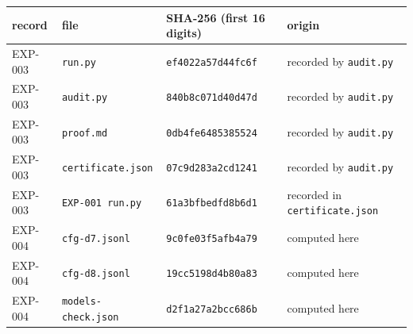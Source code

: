 \begin{tabular}{llll}
\toprule
record & file & SHA-256 (first 16 digits) & origin \\
\midrule
EXP-003 & \texttt{run.py} & \texttt{ef4022a57d44fc6f} & recorded by \texttt{audit.py} \\
EXP-003 & \texttt{audit.py} & \texttt{840b8c071d40d47d} & recorded by \texttt{audit.py} \\
EXP-003 & \texttt{proof.md} & \texttt{0db4fe6485385524} & recorded by \texttt{audit.py} \\
EXP-003 & \texttt{certificate.json} & \texttt{07c9d283a2cd1241} & recorded by \texttt{audit.py} \\
EXP-003 & \texttt{EXP-001 run.py} & \texttt{61a3bfbedfd8b6d1} & recorded in \texttt{certificate.json} \\
EXP-004 & \texttt{cfg-d7.jsonl} & \texttt{9c0fe03f5afb4a79} & computed here \\
EXP-004 & \texttt{cfg-d8.jsonl} & \texttt{19cc5198d4b80a83} & computed here \\
EXP-004 & \texttt{models-check.json} & \texttt{d2f1a27a2bcc686b} & computed here \\
\bottomrule
\end{tabular}
